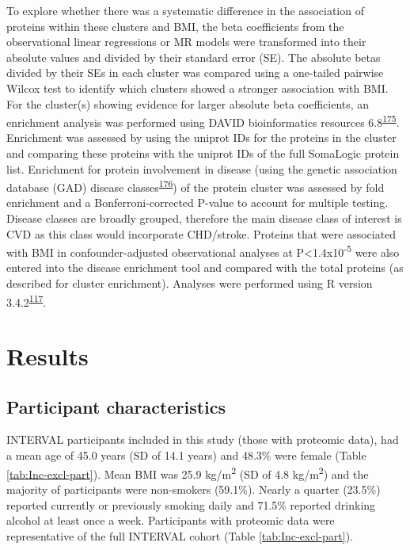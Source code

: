 \documentclass[11pt,twoside]{bristolthesis}
\begin{document}
To explore whether there was a systematic difference in the association of proteins within these clusters and BMI, the beta coefficients from the observational linear regressions or MR models were transformed into their absolute values and divided by their standard error (SE). The absolute betas divided by their SEs in each cluster was compared using a one-tailed pairwise Wilcox test to identify which clusters showed a stronger association with BMI. For the cluster(s) showing evidence for larger absolute beta coefficients, an enrichment analysis was performed using DAVID bioinformatics resources 6.8\textsuperscript{\protect\hyperlink{ref-Huang2009}{175}}. Enrichment was assessed by using the uniprot IDs for the proteins in the cluster and comparing these proteins with the uniprot IDs of the full SomaLogic protein list. Enrichment for protein involvement in disease (using the genetic association database (GAD) disease classes\textsuperscript{\protect\hyperlink{ref-Becker2004a}{176}}) of the protein cluster was assessed by fold enrichment and a Bonferroni-corrected P-value to account for multiple testing. Disease classes are broadly grouped, therefore the main disease class of interest is CVD as this class would incorporate CHD/stroke. Proteins that were associated with BMI in confounder-adjusted observational analyses at P\textless1.4x10\textsuperscript{-5} were also entered into the disease enrichment tool and compared with the total proteins (as described for cluster enrichment). Analyses were performed using R version 3.4.2\textsuperscript{\protect\hyperlink{ref-Team2019a}{117}}.

\hypertarget{results-3}{%
\section{Results}\label{results-3}}

\hypertarget{participant-characteristics-1}{%
\subsection{Participant characteristics}\label{participant-characteristics-1}}

INTERVAL participants included in this study (those with proteomic data), had a mean age of 45.0 years (SD of 14.1 years) and 48.3\% were female (Table \ref{tab:Inc-excl-part}). Mean BMI was 25.9 kg/m\textsuperscript{2} (SD of 4.8 kg/m\textsuperscript{2}) and the majority of participants were non-smokers (59.1\%). Nearly a quarter (23.5\%) reported currently or previously smoking daily and 71.5\% reported drinking alcohol at least once a week. Participants with proteomic data were representative of the full INTERVAL cohort (Table \ref{tab:Inc-excl-part}).
\end{document}
